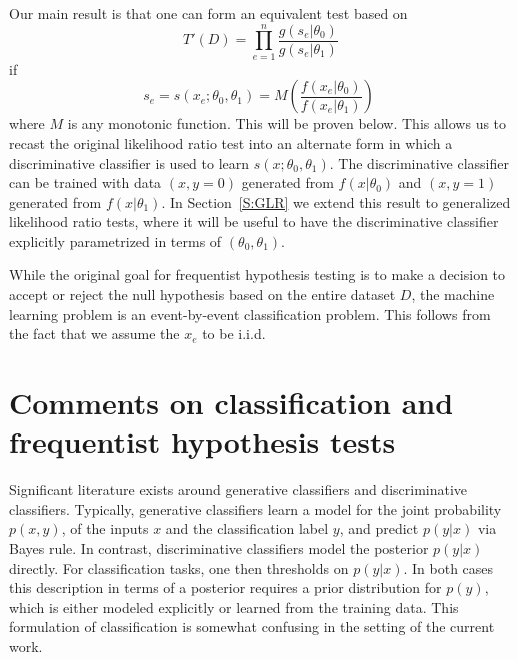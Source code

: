 \documentclass[11pt, oneside]{article}   	%
\begin{document}
Our main result is that one can form an equivalent test based on 
\begin{equation}\label{eq:equivLRtest}
T'(D) = \prod_{e=1}^n \frac{ g(s_e | \theta_0)}{ g(s_e | \theta_1)}
\end{equation}
if 
\begin{equation}
s_e = s(x_e; \theta_0, \theta_1) = M\left(\frac{ f(x_e|\theta_0)}{ f(x_e|\theta_1)} \right) \; 
\end{equation}
where $M$ is any monotonic function. This will be proven below.
This allows us to recast the original likelihood ratio test into an alternate form in which a discriminative classifier is 
used to learn $s(x; \theta_0, \theta_1)$. The discriminative classifier can be trained with data $(x,y=0)$ generated 
from $f(x|\theta_0)$ and $(x,y=1)$ generated from $f(x|\theta_1)$. In Section~\ref{S:GLR} we extend this result to generalized likelihood ratio tests, where it will be useful to have the discriminative classifier explicitly parametrized in terms of $(\theta_0, \theta_1)$.

While the original goal for frequentist hypothesis testing is to make a decision to accept or reject the null hypothesis based on the entire dataset $D$, the machine learning problem is an event-by-event classification problem. This follows from the fact that we assume the $x_e$ to be i.i.d.

\section{Comments on classification and frequentist hypothesis tests}

Significant literature exists around generative classifiers and discriminative classifiers. Typically, generative classifiers learn a model for the joint probability $p(x,y)$, of the inputs $x$ and the classification label $y$, and predict $p(y|x)$ via Bayes rule. In contrast, discriminative classifiers model the posterior $p(y|x)$ directly. For classification tasks, one then thresholds on $p(y|x)$. In both cases this description in terms of a posterior requires a prior distribution for $p(y)$, which is either modeled explicitly or learned from the training data. 
This formulation of classification is somewhat confusing in the setting of the current work. 
\end{document}
